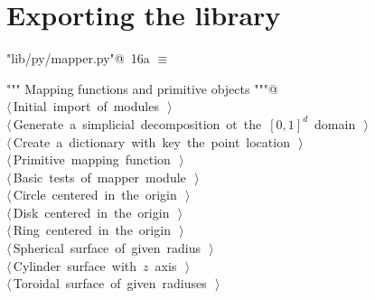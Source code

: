 \documentclass[11pt,oneside]{article}	%
\begin{document}
\section{Exporting the library}
\begin{flushleft} \small \label{scrap33}
\protect{}\verb@"lib/py/mapper.py"@\nobreak\ {\footnotesize 16a }$\equiv$
\vspace{-1ex}
\begin{list}{}{} \item
\mbox{}\verb@""" Mapping functions and primitive objects """@\\
\mbox{}\verb@@\hbox{$\langle\,$Initial import of modules\nobreak\ {\footnotesize {}}$\,\rangle$}\verb@@\\
\mbox{}\verb@@\hbox{$\langle\,$Generate a simplicial decomposition ot the $[0,1]^d$ domain\nobreak\ {\footnotesize {}}$\,\rangle$}\verb@@\\
\mbox{}\verb@@\hbox{$\langle\,$Create a dictionary with key the point location\nobreak\ {\footnotesize {}}$\,\rangle$}\verb@@\\
\mbox{}\verb@@\hbox{$\langle\,$Primitive mapping function\nobreak\ {\footnotesize {}}$\,\rangle$}\verb@@\\
\mbox{}\verb@@\hbox{$\langle\,$Basic tests of mapper module\nobreak\ {\footnotesize {}}$\,\rangle$}\verb@@\\
\mbox{}\verb@@\hbox{$\langle\,$Circle centered in the origin\nobreak\ {\footnotesize {}}$\,\rangle$}\verb@@\\
\mbox{}\verb@@\hbox{$\langle\,$Disk centered in the origin\nobreak\ {\footnotesize {}}$\,\rangle$}\verb@@\\
\mbox{}\verb@@\hbox{$\langle\,$Ring centered in the origin\nobreak\ {\footnotesize {}}$\,\rangle$}\verb@@\\
\mbox{}\verb@@\hbox{$\langle\,$Spherical surface of given radius\nobreak\ {\footnotesize {}}$\,\rangle$}\verb@@\\
\mbox{}\verb@@\hbox{$\langle\,$Cylinder surface with $z$ axis\nobreak\ {\footnotesize {}}$\,\rangle$}\verb@@\\
\mbox{}\verb@@\hbox{$\langle\,$Toroidal surface of given radiuses\nobreak\ {\footnotesize {}}$\,\rangle$}\verb@@\\

\end{list}
\end{flushleft}
\end{document}
